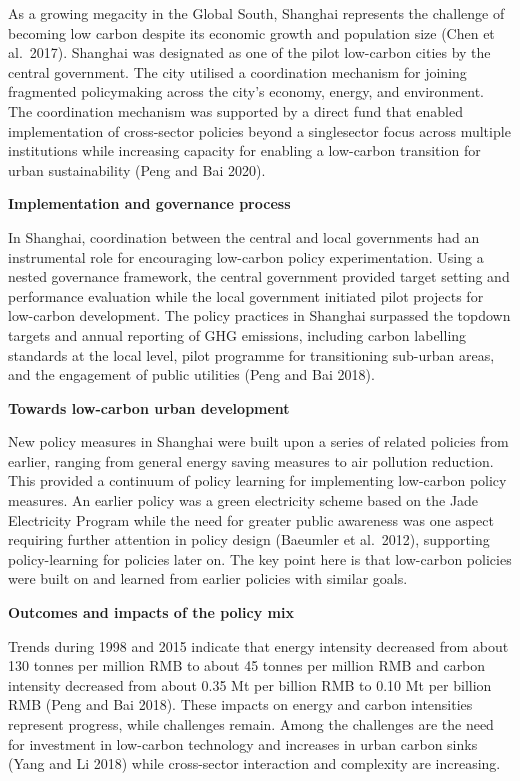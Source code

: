 \documentclass[
  letterpaper,
  DIV=11,
  numbers=noendperiod]{scrreprt}
\begin{document}
As a growing megacity in the Global South, Shanghai represents the
challenge of becoming low carbon despite its economic growth and
population size (Chen et al.~2017). Shanghai was designated as one of
the pilot low-carbon cities by the central government. The city utilised
a coordination mechanism for joining fragmented policymaking across the
city's economy, energy, and environment. The coordination mechanism was
supported by a direct fund that enabled implementation of cross-sector
policies beyond a singlesector focus across multiple institutions while
increasing capacity for enabling a low-carbon transition for urban
sustainability (Peng and Bai 2020).

\textbf{Implementation and governance process}

In Shanghai, coordination between the central and local governments had
an instrumental role for encouraging low-carbon policy experimentation.
Using a nested governance framework, the central government provided
target setting and performance evaluation while the local government
initiated pilot projects for low-carbon development. The policy
practices in Shanghai surpassed the topdown targets and annual reporting
of GHG emissions, including carbon labelling standards at the local
level, pilot programme for transitioning sub-urban areas, and the
engagement of public utilities (Peng and Bai 2018).

\textbf{Towards low-carbon urban development}

New policy measures in Shanghai were built upon a series of related
policies from earlier, ranging from general energy saving measures to
air pollution reduction. This provided a continuum of policy learning
for implementing low-carbon policy measures. An earlier policy was a
green electricity scheme based on the Jade Electricity Program while the
need for greater public awareness was one aspect requiring further
attention in policy design (Baeumler et al.~2012), supporting
policy-learning for policies later on. The key point here is that
low-carbon policies were built on and learned from earlier policies with
similar goals.

\textbf{Outcomes and impacts of the policy mix}

Trends during 1998 and 2015 indicate that energy intensity decreased
from about 130 tonnes per million RMB to about 45 tonnes per million RMB
and carbon intensity decreased from about 0.35 Mt per billion RMB to
0.10 Mt per billion RMB (Peng and Bai 2018). These impacts on energy and
carbon intensities represent progress, while challenges remain. Among
the challenges are the need for investment in low-carbon technology and
increases in urban carbon sinks (Yang and Li 2018) while cross-sector
interaction and complexity are increasing.
\end{document}
